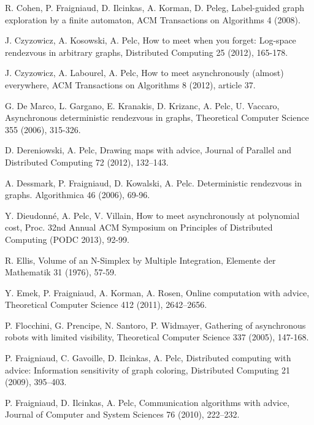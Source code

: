 \documentclass{llncs}
\begin{document}
\begin{thebibliography}{12}
R. Cohen, P. Fraigniaud, D. Ilcinkas, A. Korman, D. Peleg, 
Label-guided graph exploration by a finite automaton, 
ACM Transactions on Algorithms 4 (2008).



J. Czyzowicz, A. Kosowski, A. Pelc, How to meet when you forget: Log-space rendezvous in arbitrary graphs, Distributed Computing 25 (2012), 165-178. 

J. Czyzowicz, A. Labourel, A. Pelc, How to meet asynchronously (almost) everywhere, 
ACM Transactions on Algorithms 8 (2012), article 37. 





G. De Marco, L. Gargano, E. Kranakis, D. Krizanc, A. Pelc, U. Vaccaro, 
Asynchronous deterministic rendezvous in graphs, 
Theoretical Computer Science 355 (2006), 315-326.

D. Dereniowski, A. Pelc, Drawing maps with advice,  Journal of Parallel and Distributed Computing 72 (2012), 132--143. 



A. Dessmark, P. Fraigniaud, D. Kowalski, A. Pelc.
Deterministic rendezvous in graphs.
Algorithmica 46 (2006), 69-96.


Y. Dieudonn\'{e}, A. Pelc, V. Villain, How to meet asynchronously at polynomial cost, Proc. 32nd Annual ACM Symposium on Principles of Distributed Computing (PODC 2013), 92-99.

R. Ellis,
Volume of an N-Simplex by Multiple Integration, 
Elemente der Mathematik 31 (1976), 57-59.

Y. Emek, P. Fraigniaud, A. Korman, A. Rosen, Online computation with advice, Theoretical Computer Science 412 (2011), 2642--2656.




P. Flocchini, G. Prencipe, N. Santoro, P. Widmayer,
Gathering of asynchronous robots with limited visibility, Theoretical Computer Science 337 (2005), 147-168.




P. Fraigniaud, C. Gavoille, D. Ilcinkas, A. Pelc, 
Distributed computing with advice: Information sensitivity of graph coloring, 
Distributed Computing 21 (2009), 395--403.

P. Fraigniaud, D. Ilcinkas, A. Pelc, 
Communication algorithms with advice, Journal of  Computer and System Sciences 76 (2010), 222--232.



\end{thebibliography}
\end{document}
